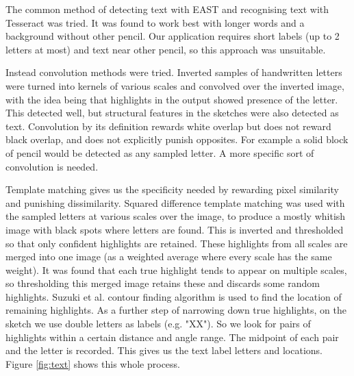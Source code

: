 \documentclass{IEEEtran}
\begin{document}
The common method of detecting text with EAST and recognising text with Tesseract was tried. It was found to work best with longer words and a background without other pencil. Our application requires short labels (up to 2 letters at most) and text near other pencil, so this approach was unsuitable.

Instead convolution methods were tried. Inverted samples of handwritten letters were turned into kernels of various scales and convolved over the inverted image, with the idea being that highlights in the output showed presence of the letter. This detected well, but structural features in the sketches were also detected as text. Convolution by its definition rewards white overlap but does not reward black overlap, and does not explicitly punish opposites. For example a solid block of pencil would be detected as any sampled letter. A more specific sort of convolution is needed.

Template matching gives us the specificity needed by rewarding pixel similarity and punishing dissimilarity. Squared difference template matching was used with the sampled letters at various scales over the image, to produce a mostly whitish image with black spots where letters are found. This is inverted and thresholded so that only confident highlights are retained. These highlights from all scales are merged into one image (as a weighted average where every scale has the same weight). It was found that each true highlight tends to appear on multiple scales, so thresholding this merged image retains these and discards some random highlights. Suzuki et al. \cite{suzuki1985topological} contour finding algorithm is used to find the location of remaining highlights. As a further step of narrowing down true highlights, on the sketch we use double letters as labels (e.g. "XX"). So we look for pairs of highlights within a certain distance and angle range. The midpoint of each pair and the letter is recorded. This gives us the text label letters and locations. Figure \ref{fig:text} shows this whole process.
\end{document}
